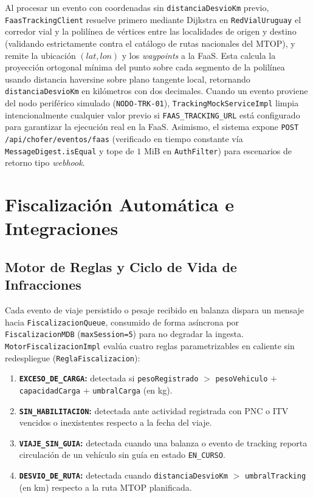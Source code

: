\documentclass[11pt,a4paper,twocolumn]{article}
\begin{document}
Al procesar un evento con coordenadas sin \texttt{distanciaDesvioKm} previo, \texttt{FaasTrackingClient} resuelve primero mediante Dijkstra en \texttt{RedVialUruguay} el corredor vial y la polilínea de vértices entre las localidades de origen y destino (validando estrictamente contra el catálogo de rutas nacionales del MTOP), y remite la ubicación $(lat, lon)$ y los \textit{waypoints} a la FaaS. Esta calcula la proyección ortogonal mínima del punto sobre cada segmento de la polilínea usando distancia haversine sobre plano tangente local, retornando \texttt{distanciaDesvioKm} en kilómetros con dos decimales. Cuando un evento proviene del nodo periférico simulado (\texttt{NODO-TRK-01}), \texttt{TrackingMockServiceImpl} limpia intencionalmente cualquier valor previo si \texttt{FAAS\_TRACKING\_URL} está configurado para garantizar la ejecución real en la FaaS. Asimismo, el sistema expone \texttt{POST /api/chofer/eventos/faas} (verificado en tiempo constante vía \texttt{MessageDigest.isEqual} y tope de $1\text{ MiB}$ en \texttt{AuthFilter}) para escenarios de retorno tipo \textit{webhook}.

\section{Fiscalización Automática e Integraciones}\label{sec:fisc}

\subsection{Motor de Reglas y Ciclo de Vida de Infracciones}

Cada evento de viaje persistido o pesaje recibido en balanza dispara un mensaje hacia \texttt{FiscalizacionQueue}, consumido de forma asíncrona por \texttt{FiscalizacionMDB} (\texttt{maxSession=5}) para no degradar la ingesta. \texttt{MotorFiscalizacionImpl} evalúa cuatro reglas parametrizables en caliente sin redespliegue (\texttt{ReglaFiscalizacion}):
\begin{enumerate}
    \item \textbf{\texttt{EXCESO\_DE\_CARGA}:} detectada si \texttt{pesoRegistrado} $>$ \texttt{pesoVehiculo} $+$ \texttt{capacidadCarga} $+$ \texttt{umbralCarga} (en kg).
    \item \textbf{\texttt{SIN\_HABILITACION}:} detectada ante actividad registrada con PNC o ITV vencidos o inexistentes respecto a la fecha del viaje.
    \item \textbf{\texttt{VIAJE\_SIN\_GUIA}:} detectada cuando una balanza o evento de tracking reporta circulación de un vehículo sin guía en estado \texttt{EN\_CURSO}.
    \item \textbf{\texttt{DESVIO\_DE\_RUTA}:} detectada cuando \texttt{distanciaDesvioKm} $>$ \texttt{umbralTracking} (en km) respecto a la ruta MTOP planificada.
\end{enumerate}
\end{document}
